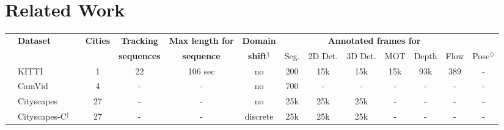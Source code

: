 \section{Related Work}
\begin{table*}[!t]
\centering
\footnotesize
\setlength{\tabcolsep}{5pt}
\begin{tabular}{clccccccccccc}
\toprule
& \multirow{2}{*}{\textbf{Dataset}}                                                     & \multirow{2}{*}{\textbf{Cities}} & \textbf{Tracking} & \textbf{\textbf{Max length for}} & \textbf{\textbf{Domain}} & \multicolumn{6}{c}{\textbf{Annotated frames for}}                                                                           \\ \cline{7-13} 
                         &                                                              &                                  & \textbf{sequences}                                    & \textbf{sequence}                & \textbf{shift$^\dagger$}       & Seg.                 & 2D Det.              & 3D Det.              & MOT           & Depth    & Flow        & Pose$^\diamondsuit$         \\ \midrule
\parbox[t]{2mm}{} & KITTI~\cite{geiger2013vision}                                   & 1                                & 22                                  &  106 sec                                                & no                                            & 200                  & 15k                  & 15k                  & 15k                  &    93k      & 389         & -          \\
& CamVid~\cite{brostow2009semantic}                               & 4                                & -                                   & -                                                  & no                                            & 700                  & -                    & -                    & -                    & -        & -        & -            \\
 & Cityscapes~\cite{cordts2016cityscapes}                          & 27                               & -                                   & -                                                  & no                                            & 25k                  & 25k                    & 25k                    & -                    & -        & -           & -          \\
& Cityscapes-C$^\ddagger$ ~\cite{michaelis2019benchmarking}                   & 27                               & -                                   & -                                                 & discrete                                      & 25k                  & 25k                    & 25k                    & -                    & -        & -              & -       \\

\end{tabular}
\end{table*}
